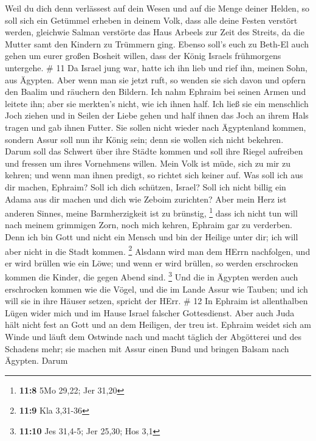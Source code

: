Weil du dich denn verlässest auf dein Wesen und auf die Menge deiner
Helden, so soll sich ein Getümmel erheben in deinem Volk, dass alle
deine Festen verstört werden, gleichwie Salman verstörte das Haus
Arbeels zur Zeit des Streits, da die Mutter samt den Kindern zu Trümmern
ging.  Ebenso soll's euch zu Beth-El auch gehen um eurer
großen Bosheit willen, dass der König Israels frühmorgens untergehe. \#
11  Da Israel jung war, hatte ich ihn lieb und rief ihn,
meinen Sohn, aus Ägypten.  Aber wenn man sie jetzt ruft, so
wenden sie sich davon und opfern den Baalim und räuchern den Bildern.
 Ich nahm Ephraim bei seinen Armen und leitete ihn; aber sie
merkten's nicht, wie ich ihnen half.  Ich ließ sie ein
menschlich Joch ziehen und in Seilen der Liebe gehen und half ihnen das
Joch an ihrem Hals tragen und gab ihnen Futter.  Sie sollen
nicht wieder nach Ägyptenland kommen, sondern Assur soll nun ihr König
sein; denn sie wollen sich nicht bekehren.  Darum soll das
Schwert über ihre Städte kommen und soll ihre Riegel aufreiben und
fressen um ihres Vornehmens willen.  Mein Volk ist müde,
sich zu mir zu kehren; und wenn man ihnen predigt, so richtet sich
keiner auf.  Was soll ich aus dir machen, Ephraim? Soll ich
dich schützen, Israel? Soll ich nicht billig ein Adama aus dir machen
und dich wie Zeboim zurichten? Aber mein Herz ist anderen Sinnes, meine
Barmherzigkeit ist zu brünstig, \footnote{\textbf{11:8} 5Mo 29,22; Jer
  31,20}  dass ich nicht tun will nach meinem grimmigen
Zorn, noch mich kehren, Ephraim gar zu verderben. Denn ich bin Gott und
nicht ein Mensch und bin der Heilige unter dir; ich will aber nicht in
die Stadt kommen. \footnote{\textbf{11:9} Kla 3,31-36} 
Alsdann wird man dem HErrn nachfolgen, und er wird brüllen wie ein Löwe;
und wenn er wird brüllen, so werden erschrocken kommen die Kinder, die
gegen Abend sind. \footnote{\textbf{11:10} Jes 31,4-5; Jer 25,30; Hos
  3,1}  Und die in Ägypten werden auch erschrocken kommen
wie die Vögel, und die im Lande Assur wie Tauben; und ich will sie in
ihre Häuser setzen, spricht der HErr. \# 12  In Ephraim ist
allenthalben Lügen wider mich und im Hause Israel falscher Gottesdienst.
Aber auch Juda hält nicht fest an Gott und an dem Heiligen, der treu
ist.  Ephraim weidet sich am Winde und läuft dem Ostwinde
nach und macht täglich der Abgötterei und des Schadens mehr; sie machen
mit Assur einen Bund und bringen Balsam nach Ägypten.  Darum
